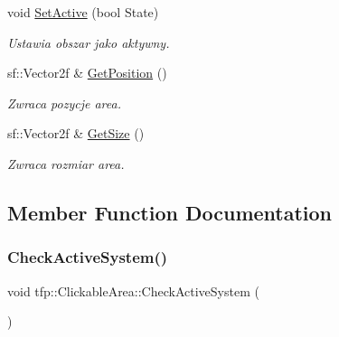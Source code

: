 \begin{DoxyCompactItemize}
\mbox{\label{classtfp_1_1_clickable_area_a3fb5bb723bff9e60248f33721b04460e}} 
void \mbox{\hyperlink{classtfp_1_1_clickable_area_a3fb5bb723bff9e60248f33721b04460e}{Set\+Active}} (bool State)
\begin{DoxyCompactList}\small\item\em Ustawia obszar jako aktywny. \end{DoxyCompactList}\item 
\mbox{\label{classtfp_1_1_clickable_area_a059b79306eb4aa372e515ae68e872b2b}} 
sf\+::\+Vector2f \& \mbox{\hyperlink{classtfp_1_1_clickable_area_a059b79306eb4aa372e515ae68e872b2b}{Get\+Position}} ()
\begin{DoxyCompactList}\small\item\em Zwraca pozycje area. \end{DoxyCompactList}\item 
\mbox{\label{classtfp_1_1_clickable_area_a1acb675c98f351065e33a248cd6893ed}} 
sf\+::\+Vector2f \& \mbox{\hyperlink{classtfp_1_1_clickable_area_a1acb675c98f351065e33a248cd6893ed}{Get\+Size}} ()
\begin{DoxyCompactList}\small\item\em Zwraca rozmiar area. \end{DoxyCompactList}\end{DoxyCompactItemize}


\subsection{Member Function Documentation}
\mbox{\label{classtfp_1_1_clickable_area_afeeaa98f916febd990f3a382612c8e34}} 
\subsubsection{\texorpdfstring{Check\+Active\+System()}{CheckActiveSystem()}}
{\footnotesize\ttfamily void tfp\+::\+Clickable\+Area\+::\+Check\+Active\+System (\begin{DoxyParamCaption}{ }\end{DoxyParamCaption})}



